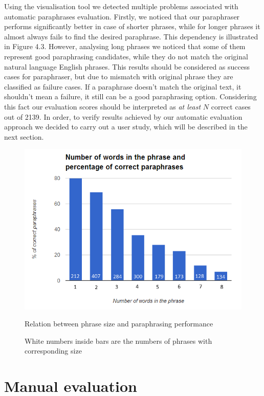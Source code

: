 Using the visualisation tool we detected multiple problems associated with automatic paraphrases evaluation. Firstly, we noticed that our paraphraser performs significantly better in case of shorter phrases, while for longer phrases it almost always fails to find the desired paraphrase. This dependency is illustrated in Figure 4.3. However, analysing long phrases we noticed that some of them represent good paraphrasing candidates, while they do not match the original natural language English phrases. This results should be considered as success cases for paraphraser, but due to mismatch with original phrase they are classified as failure cases. If a paraphrase doesn't match the original text, it shouldn't mean a failure, it still can be a good paraphrasing option. Considering this fact our evaluation scores should be interpreted as \emph{at least} $N$ correct cases out of 2139. In order, to verify results achieved by our automatic evaluation approach we decided to carry out a user study, which will be described in the next section.

\begin{figure}
 \centering 
 \includegraphics[scale=0.8]{g/phrase-size-chart.png}
 \caption{Relation between phrase size and paraphrasing performance}
 \caption*{White numbers inside bars are the numbers of phrases with corresponding size}
\end{figure}


\section{Manual evaluation}

